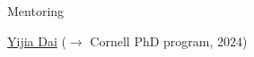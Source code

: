 \begin{rubric}{Mentoring}

    \entry*[2023 -- 2024] \href{https://daiyijia02.github.io/}{Yijia Dai} ($\rightarrow$ Cornell PhD program, 2024)
\end{rubric}